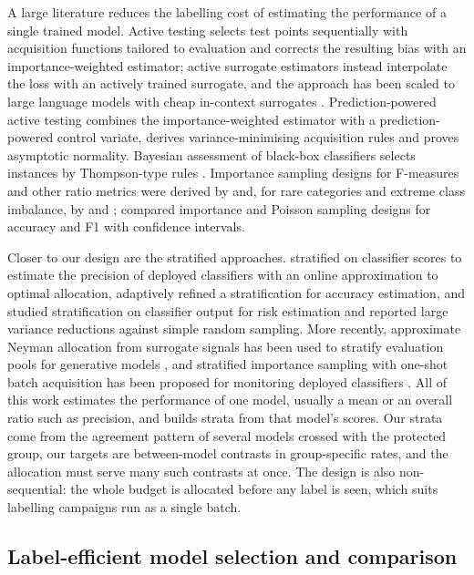 \documentclass[pdflatex,sn-mathphys-num,iicol]{sn-jnl}
\theoremstyle{thmstyleone}
\theoremstyle{thmstyletwo}
\theoremstyle{thmstylethree}
\begin{document}
A large literature reduces the labelling cost of estimating the performance of a single trained model. Active testing \citep{kossen2021active} selects test points sequentially with acquisition functions tailored to evaluation and corrects the resulting bias with an importance-weighted estimator; active surrogate estimators \citep{kossen2022ase} instead interpolate the loss with an actively trained surrogate, and the approach has been scaled to large language models with cheap in-context surrogates \citep{berrada2025}. Prediction-powered active testing \citep{ashouritaklimi2026} combines the importance-weighted estimator with a prediction-powered control variate, derives variance-minimising acquisition rules and proves asymptotic normality. Bayesian assessment of black-box classifiers selects instances by Thompson-type rules \citep{ji2021active}. Importance sampling designs for F-measures and other ratio metrics were derived by \citet{sawade2010fmeasure} and, for rare categories and extreme class imbalance, by \citet{poms2021} and \citet{marchant2017}; \citet{yilmaz2021} compared importance and Poisson sampling designs for accuracy and F1 with confidence intervals.

Closer to our design are the stratified approaches. \citet{bennett2010online} stratified on classifier scores to estimate the precision of deployed classifiers with an online approximation to optimal allocation, \citet{katariya2012} adaptively refined a stratification for accuracy estimation, and \citet{kumar2018classifier} studied stratification on classifier output for risk estimation and reported large variance reductions against simple random sampling. More recently, approximate Neyman allocation from surrogate signals has been used to stratify evaluation pools for generative models \citep{liu2026neyman}, and stratified importance sampling with one-shot batch acquisition has been proposed for monitoring deployed classifiers \citep{marsigli2026}. All of this work estimates the performance of one model, usually a mean or an overall ratio such as precision, and builds strata from that model's scores. Our strata come from the agreement pattern of several models crossed with the protected group, our targets are between-model contrasts in group-specific rates, and the allocation must serve many such contrasts at once. The design is also non-sequential: the whole budget is allocated before any label is seen, which suits labelling campaigns run as a single batch.

\subsection{Label-efficient model selection and comparison}
\end{document}
